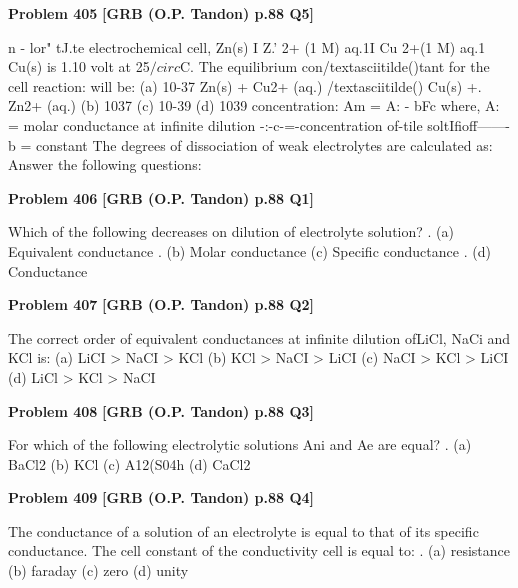 \begin{problembox}
\textbf{Problem 405} \hfill \textbf{[GRB (O.P. Tandon) p.88 Q5]}
\label{q:ext-grb_all_questions-405}

n - lor" tJ.te electrochemical cell, 
Zn(s) I Z.' 2+ (1 M) aq.1I Cu 2+(1 M) aq.1 Cu(s) is 1.10 volt at 
25$/circ$C. 
The equilibrium con/textasciitilde()tant for the cell reaction: 
will be: 
(a) 10-37 
Zn(s) + Cu2+ (aq.) /textasciitilde() 
Cu(s) +. Zn2+ (aq.) 
(b) 1037 
(c) 10-39 
(d) 1039 
concentration: 
Am = A: - bFc 
where, A: = molar conductance at infinite dilution 
-:-c-=-concentration of-tile soltIfioff-------
b = constant 
The degrees of dissociation of weak electrolytes are calculated 
as: 
Answer the following questions:
\end{problembox}

\begin{problembox}
\textbf{Problem 406} \hfill \textbf{[GRB (O.P. Tandon) p.88 Q1]}
\label{q:ext-grb_all_questions-406}

Which of the following decreases on dilution of electrolyte 
solution? . 
(a) Equivalent conductance . (b) Molar conductance 
(c) Specific conductance 
. (d) Conductance
\end{problembox}

\begin{problembox}
\textbf{Problem 407} \hfill \textbf{[GRB (O.P. Tandon) p.88 Q2]}
\label{q:ext-grb_all_questions-407}

The correct order of equivalent conductances at infinite 
dilution ofLiCl, NaCi and KCl is: 
(a) LiCI > NaCI > KCl 
(b) KCl > NaCI > LiCI 
(c) NaCI > KCl > LiCI 
(d) LiCl > KCl > NaCI
\end{problembox}

\begin{problembox}
\textbf{Problem 408} \hfill \textbf{[GRB (O.P. Tandon) p.88 Q3]}
\label{q:ext-grb_all_questions-408}

For which of the following electrolytic solutions Ani and Ae 
are equal? 
. 
(a) BaCl2 
(b) KCl 
(c) A12(S04h (d) CaCl2
\end{problembox}

\begin{problembox}
\textbf{Problem 409} \hfill \textbf{[GRB (O.P. Tandon) p.88 Q4]}
\label{q:ext-grb_all_questions-409}

The conductance of a solution of an electrolyte is equal to that 
of its specific conductance. The cell constant of the 
conductivity cell is equal to: 
. (a) resistance 
(b) faraday 
(c) zero 
(d) unity
\end{problembox}

